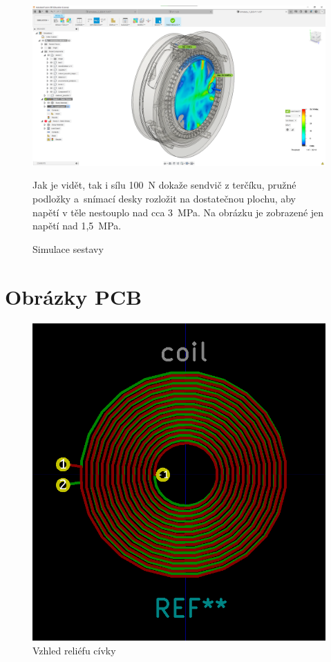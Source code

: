 \begin{figure}
    \centering
    \includegraphics[width=\textwidth]{kapitoly/obrazky/E4/machanika_tlakove_desky/simulace/zjednodusena_sestava_pri_F100N_nezobrazeno_napeti_pod_1,5MPa.png}
    \caption{Simulace sestavy}
    Jak je vidět, tak i sílu 100~N dokaže sendvič z terčíku, pružné podložky a~snímací desky rozložit na dostatečnou plochu, aby napětí v těle nestouplo 
    nad cca 3~MPa. Na obrázku je zobrazené jen napětí nad 1,5~MPa.
    \label{fig:E4-simulace_tlakovky}
\end{figure}

\section{Obrázky PCB}

\begin{figure}
    \centering
    \includegraphics[width=\textwidth]{kapitoly/obrazky/E4/elektronika_tlakove_desky/civka.png}
    \caption{Vzhled reliéfu cívky}
    \label{fig:E4-relief_civka}
\end{figure}

